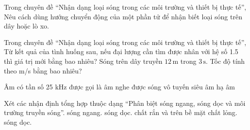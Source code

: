 \begin{ex}
Trong chuyên đề “Nhận dạng loại sóng trong các môi trường và thiết bị thực tế”, Nêu cách dùng hướng chuyển động của một phần tử để nhận biết loại sóng trên dây hoặc lò xo.
\choiceTF

\end{ex}

\begin{ex}
Trong chuyên đề “Nhận dạng loại sóng trong các môi trường và thiết bị thực tế”, Từ kết quả của tình huống sau, nếu đại lượng cần tìm được nhân với hệ số 1.5 thì giá trị mới bằng bao nhiêu? Sóng trên dây truyền $12\,\text{m}$ trong $3\,\text{s}$. Tốc độ tính theo m/s bằng bao nhiêu?
\end{ex}

\begin{ex}
Âm có tần số 25 kHz được gọi là
\choice
{âm nghe được}
{sóng vô tuyến}
{\True siêu âm}
{hạ âm}
\end{ex}

\begin{ex}
Xét các nhận định tổng hợp thuộc dạng “Phân biệt sóng ngang, sóng dọc và môi trường truyền sóng”.
\choiceTF
{\True sóng ngang.}
{\True sóng dọc.}
{\True chất rắn và trên bề mặt chất lỏng.}
{sóng dọc.}
\end{ex}

